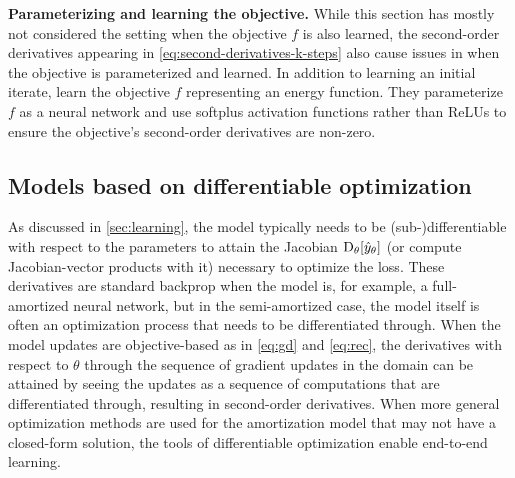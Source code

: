 \textbf{Parameterizing and learning the objective.}
While this section has mostly not considered the setting when
the objective $f$ is also learned,
the second-order derivatives appearing in
\cref{eq:second-derivatives-k-steps}
also cause issues in when the objective is parameterized
and learned.
In addition to learning an initial iterate, \citet{belanger2017end}
learn the objective $f$ representing an energy function.
They parameterize $f$ as a neural network and use softplus
activation functions rather than ReLUs to ensure the
objective's second-order derivatives are non-zero.

\subsection{Models based on differentiable optimization}
As discussed in \cref{sec:learning}, the model typically needs
to be (sub-)differentiable with respect to the parameters
to attain the Jacobian $\mathrm{D}_\theta[\hat y_\theta]$
(or compute Jacobian-vector products with it)
necessary to optimize the loss.
These derivatives are standard backprop when the model
is, for example, a full-amortized neural network, but
in the semi-amortized case, the model itself is often an
optimization process that needs to be differentiated through.
When the model updates are objective-based as in
\cref{eq:gd} and \cref{eq:rec}, the derivatives with respect
to $\theta$ through the sequence of gradient updates
in the domain can be attained by seeing the updates
as a sequence of computations that are differentiated through,
resulting in second-order derivatives.
When more general optimization methods are used for
the amortization model that may not have a closed-form
solution, the tools of differentiable optimization
\citep{domke2012generic,gould2016differentiating,amos2017optnet,amos2019differentiable,agrawal2019differentiable}
enable end-to-end learning.

